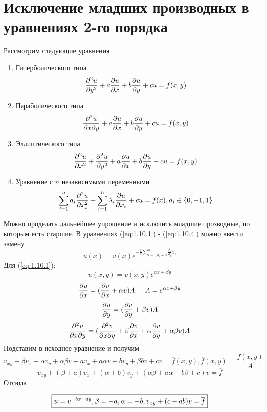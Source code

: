 \documentclass[../main.tex]{subfiles}
\begin{document}
\section{Исключение младших производных в уравнениях 2-го порядка}
Рассмотрим следующие уравнения
{\bf
\begin{enumerate}
	\item Гиперболического типа
	      \begin{equation} \label{eq:1.10.1}
		      \frac{\partial ^2 u}{\partial y^2} + a \frac{\partial u}{\partial x} + b \frac{\partial u}{\partial y} + cu = f(x, y)
	      \end{equation}
	\item Параболического типа
	      \begin{equation} \label{eq:1.10.2}
		      \frac{\partial ^2 u}{\partial x \partial y} + a \frac{\partial u}{\partial x} + b \frac{\partial u}{\partial y} + cu = f(x, y)
	      \end{equation}
	\item Эллиптического типа
	      \begin{equation} \label{eq:1.10.3}
		      \frac{\partial ^2 u}{\partial x^2} + \frac{\partial^2 u}{\partial y^2} + a \frac{\partial u}{\partial x} + b \frac{\partial u}{\partial y} + cu = f(x, y)
	      \end{equation}
	\item Уравнение с $n$ независимыми переменными
	      \begin{equation} \label{eq:1.10.4}
		      \sum_{i=1}^n a_i \frac{\partial^2 u }{\partial x_i^2} + \sum_{i=1}^n \lambda_i \frac{\partial u}{\partial x_i} + cu = f(x), a_i \in \{0, -1, 1\}
	      \end{equation}
\end{enumerate}}
Можно проделать дальнейшее упрощение и исключить младшие прозводные, по которым есть старшие.
В уравнениях (\ref{eq:1.10.1}) - (\ref{eq:1.10.4}) можно ввести замену
$$u(x) = v(x)e^{-\frac{1}{2} \sum \limits_{i=1, a_i \neq 0}^n \frac{\lambda_i}{a_i} x_i}$$
Для (\ref{eq:1.10.1}):
$$u(x,y) = v(x,y) e ^ {\alpha x + \beta y}$$
$$\frac{\partial u}{\partial x} = (\frac{\partial v}{\partial x}+\alpha v)A, \quad A=e ^ {\alpha x + \beta y}$$
$$\frac{\partial u}{\partial y} = (\frac{\partial v}{\partial y}+\beta v)A$$
$$\frac{\partial^2 u}{\partial x \partial y} = (\frac{\partial^2 v}{\partial x \partial y} + \beta \frac{\partial v}{\partial x} + \alpha \frac{\partial v}{\partial y} + \alpha \beta v)A$$
Подставим в исходное уравнение и получим
$$v_{xy} + \beta v_x + \alpha v_y + \alpha \beta v + a v_x + a \alpha v + b v_y + \beta b v + cv = \overline{f}(x,y), \overline{f}(x,y) = \frac{f(x,y)}{A}$$
$$v_{xy} + (\beta + a)v_x + (\alpha + b)v_y + (\alpha \beta + a \alpha + b \beta + c)v = \overline{f}$$
Отсюда

\begin{equation*}
	\boxed{
		u = v^{-bx - ay}, \\
		\beta = -a, \alpha = -b,\\
		v_{xy} + (c-ab)v = \overline{f}
	}
\end{equation*}
\end{document}

